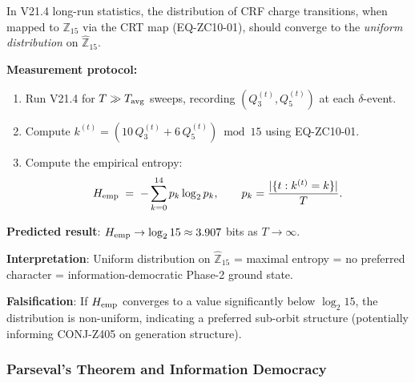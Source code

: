 \documentclass[12pt, a4paper]{article}
\begin{document}
\begin{formalbox}[title={PRED-Z401: Uniform Distribution on $\hat{\mathbb{Z}}_{15}$}]
In V21.4 long-run statistics, the distribution of CRF charge
transitions, when mapped to $\mathbb{Z}_{15}$ via the CRT map
(EQ-ZC10-01), should converge to the \emph{uniform distribution}
on $\hat{\mathbb{Z}}_{15}$.

\textbf{Measurement protocol:}
\begin{enumerate}[leftmargin=*]
  \item Run V21.4 for $T \gg T_{\rm avg}$ sweeps, recording
    $(Q_3^{(t)}, Q_5^{(t)})$ at each $\delta$-event.
  \item Compute $k^{(t)} = (10\,Q_3^{(t)} + 6\,Q_5^{(t)}) \bmod 15$
    using EQ-ZC10-01.
  \item Compute the empirical entropy:
    \begin{equation}
      H_{\rm emp}
      \;=\; -\sum_{k=0}^{14} p_k \log_2 p_k,
      \qquad p_k = \frac{|\{t : k^{(t)} = k\}|}{T}.
      \label{eq:entropy-pred}
    \end{equation}
\end{enumerate}

\textbf{Predicted result}: $H_{\rm emp} \to \log_2 15 \approx 3.907$
bits as $T \to \infty$.

\textbf{Interpretation}: Uniform distribution on $\hat{\mathbb{Z}}_{15}$
= maximal entropy = no preferred character = information-democratic
Phase-2 ground state.

\textbf{Falsification}: If $H_{\rm emp}$ converges to a value
significantly below $\log_2 15$, the distribution is
non-uniform, indicating a preferred sub-orbit structure
(potentially informing CONJ-Z405 on generation structure).
\end{formalbox}

\subsubsection{Parseval's Theorem and Information Democracy}
\end{document}
